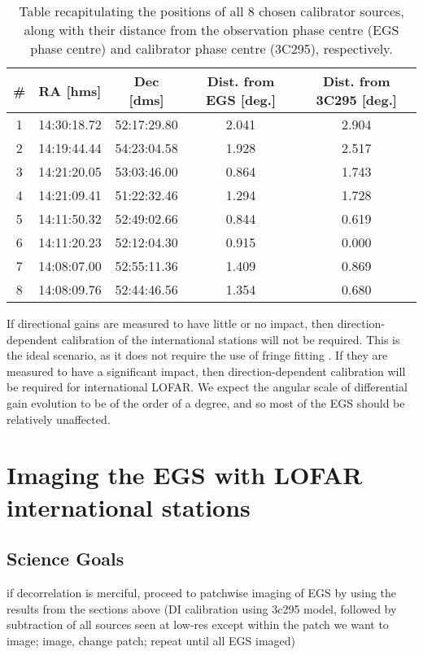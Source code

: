 \begin{table}[h!]
\begin{tabular}{ccccc}
\# & RA [hms]    & Dec [dms]   & Dist. from EGS [deg.] & Dist. from 3C295 [deg.] \\\hline
1  & 14:30:18.72 & 52:17:29.80 & 2.041                         & 2.904 \\
2  & 14:19:44.44 & 54:23:04.58 & 1.928                         & 2.517 \\ 
3  & 14:21:20.05 & 53:03:46.00 & 0.864                         & 1.743 \\
4  & 14:21:09.41 & 51:22:32.46 & 1.294                         & 1.728 \\
5  & 14:11:50.32 & 52:49:02.66 & 0.844                         & 0.619 \\
6  & 14:11:20.23 & 52:12:04.30 & 0.915                         & 0.000 \\
7  & 14:08:07.00 & 52:55:11.36 & 1.409                         & 0.869 \\
8  & 14:08:09.76 & 52:44:46.56 & 1.354                         & 0.680 \\
\end{tabular}
\caption{\label{table.LOBOS.sources1}Table recapitulating the positions of all 8 chosen calibrator sources, along with their distance from the observation phase centre (EGS phase centre) and calibrator phase centre (3C295), respectively.}
\end{table}

\pg
If directional gains are measured to have little or no impact, then direction-dependent calibration of the international stations will not be required. This is the ideal scenario, as it does not require the use of fringe fitting . If they are measured to have a significant impact, then direction-dependent calibration will be required for international LOFAR. We expect the angular scale of differential gain evolution to be of the order of a degree, and so most of the EGS should be relatively unaffected.


\section{Imaging the EGS with LOFAR international stations}

\subsection{Science Goals}

\pg
if decorrelation is merciful, proceed to patchwise imaging of EGS by using the results from the sections above (DI calibration using 3c295 model, followed by subtraction of all sources seen at low-res except within the patch we want to image; image, change patch; repeat until all EGS imaged)

\newpage